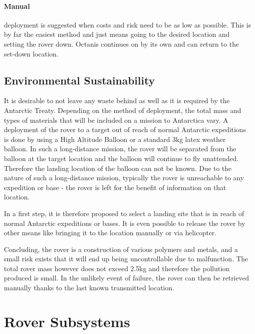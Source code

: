 \documentclass[a4paper,12pt]{article}
\begin{document}
\paragraph{Manual} deployment is suggested when costs and risk need to be as low as possible. This is by far the easiest method and just means going to the desired location and setting the rover down. Octanis continues on by its own and can return to the set-down location.




\subsection{Environmental Sustainability}
It is desirable to not leave any waste behind as well as it is required by the Antarctic Treaty. Depending on the method of deployment, the total mass and types of materials that will be included on a mission to Antarctica vary. A deployment of the rover to a target out of reach of normal Antarctic expeditions is done by using a High Altitude Balloon or a standard 3kg latex weather balloon. In such a long-distance mission, the rover will be separated from the balloon at the target location and the balloon will continue to fly unattended. Therefore the landing location of the balloon can not be known. Due to the nature of such a long-distance mission, typically the rover is unreachable to any expedition or base - the rover is left for the benefit of information on that location.

In a first step, it is therefore proposed to select a landing site that is in reach of normal Antarctic expeditions or bases. It is even possible to release the rover by other means like bringing it to the location manually or via helicopter.

Concluding, the rover is a construction of various polymers and metals, and a small risk exists that it will end up being uncontrollable due to malfunction. The total rover mass however does not exceed 2.5kg and therefore the pollution produced is small. In the unlikely event of failure, the rover can then be retrieved manually thanks to the last known transmitted location.




\section{Rover Subsystems}
\end{document}

